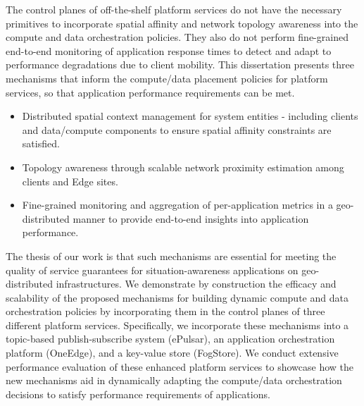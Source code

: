 \begin{summary}
The control planes of off-the-shelf platform services do not have the necessary primitives to incorporate spatial affinity and network topology awareness into the compute and data orchestration policies. They also do not perform fine-grained end-to-end monitoring of application response times to detect and adapt to performance degradations due to client mobility. This dissertation presents three mechanisms that inform the compute/data placement policies for platform services, so that application performance requirements can be met.
\begin{itemize}
\item Distributed spatial context management for system entities - including clients and data/compute components to ensure spatial affinity constraints are satisfied.
\item Topology awareness through scalable network proximity estimation among clients and Edge sites.
\item Fine-grained monitoring and aggregation of per-application metrics in a geo-distributed manner to provide end-to-end insights into application performance.
\end{itemize}
The thesis of our work is that such mechanisms are essential for meeting the quality of service guarantees for situation-awareness applications on geo-distributed infrastructures. We demonstrate by construction the efficacy and scalability of the proposed mechanisms for building dynamic compute and data orchestration policies by incorporating them in the control planes of three different platform services. Specifically, we incorporate these mechanisms into a topic-based publish-subscribe system (ePulsar), an application orchestration platform (OneEdge), and a key-value store (FogStore). We conduct extensive performance evaluation of these enhanced platform services to showcase how the new mechanisms aid in dynamically adapting the compute/data orchestration decisions to satisfy performance requirements of applications.
\end{summary}